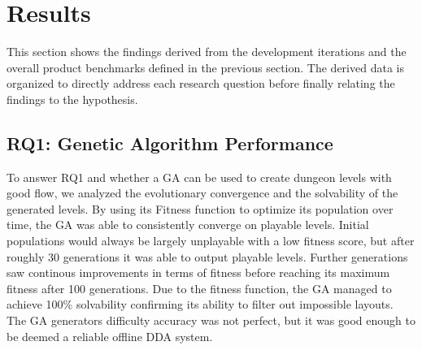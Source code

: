 \section{Results}
This section shows the findings derived from the development iterations and the overall product benchmarks defined in the previous section.
The derived data is organized to directly address each research question before finally relating the findings to the hypothesis.

\subsection{RQ1: Genetic Algorithm Performance}
To answer RQ1 and whether a GA can be used to create dungeon levels with good flow, we analyzed the evolutionary convergence and the solvability
of the generated levels. By using its Fitness function to optimize its population over time, the GA was able to consistently converge on playable levels.
Initial populations would always be largely unplayable with a low fitness score, but after roughly 30 generations it was able to output playable levels.
Further generations saw continous improvements in terms of fitness before reaching its maximum fitness after 100 generations. Due to the fitness function,
the GA managed to achieve 100\% solvability confirming its ability to filter out impossible layouts. The GA generators difficulty accuracy was not
perfect, but it was good enough to be deemed a reliable offline DDA system.

